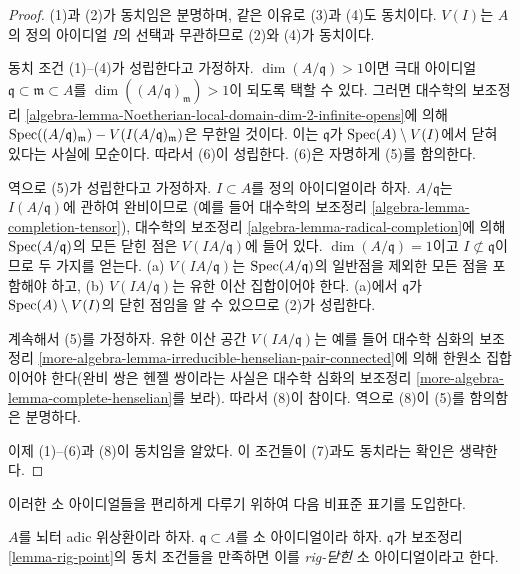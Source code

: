 \begin{proof}
(1)과 (2)가 동치임은 분명하며, 같은 이유로 (3)과 (4)도 동치이다.
$V(I)$는 $A$의 정의 아이디얼 $I$의 선택과 무관하므로 (2)와 (4)가 동치이다.

\medskip\noindent
동치 조건 (1)--(4)가 성립한다고 가정하자.
$\dim(A/\mathfrak q) > 1$이면 극대 아이디얼
$\mathfrak q \subset \mathfrak m \subset A$를
$\dim((A/\mathfrak q)_\mathfrak m) > 1$이 되도록 택할 수 있다.
그러면 대수학의 보조정리
\ref{algebra-lemma-Noetherian-local-domain-dim-2-infinite-opens}에 의해
$\mathop{\mathrm{Spec}}((A/\mathfrak q)_\mathfrak m) - V(I(A/\mathfrak q)_\mathfrak m)$은
무한일 것이다. 이는 $\mathfrak q$가 $\mathop{\mathrm{Spec}}(A) \setminus V(I)$에서
닫혀 있다는 사실에 모순이다. 따라서 (6)이 성립한다. (6)은 자명하게 (5)를 함의한다.

\medskip\noindent
역으로 (5)가 성립한다고 가정하자. $I \subset A$를 정의 아이디얼이라 하자.
$A/\mathfrak q$는 $I(A/\mathfrak q)$에 관하여 완비이므로
(예를 들어 대수학의 보조정리 \ref{algebra-lemma-completion-tensor}),
대수학의 보조정리 \ref{algebra-lemma-radical-completion}에 의해
$\mathop{\mathrm{Spec}}(A/\mathfrak q)$의 모든 닫힌 점은 $V(IA/\mathfrak q)$에 들어 있다.
$\dim(A/\mathfrak q) = 1$이고 $I \not \subset \mathfrak q$이므로 두 가지를 얻는다.
(a) $V(IA/\mathfrak q)$는 $\mathop{\mathrm{Spec}}(A/\mathfrak q)$의 일반점을 제외한
모든 점을 포함해야 하고, (b) $V(IA/\mathfrak q)$는 유한 이산 집합이어야 한다.
(a)에서 $\mathfrak q$가 $\mathop{\mathrm{Spec}}(A) \setminus V(I)$의 닫힌 점임을 알 수 있으므로
(2)가 성립한다.

\medskip\noindent
계속해서 (5)를 가정하자. 유한 이산 공간 $V(IA/\mathfrak q)$는
예를 들어 대수학 심화의 보조정리
\ref{more-algebra-lemma-irreducible-henselian-pair-connected}에 의해
한원소 집합이어야 한다(완비 쌍은 헨젤 쌍이라는 사실은 대수학 심화의 보조정리
\ref{more-algebra-lemma-complete-henselian}를 보라).
따라서 (8)이 참이다. 역으로 (8)이 (5)를 함의함은 분명하다.

\medskip\noindent
이제 (1)--(6)과 (8)이 동치임을 알았다. 이 조건들이 (7)과도 동치라는 확인은 생략한다.
\end{proof}

\noindent
이러한 소 아이디얼들을 편리하게 다루기 위하여 다음 비표준 표기를 도입한다.

\begin{definition}
\label{definition-rig-closed}
$A$를 뇌터 adic 위상환이라 하자. $\mathfrak q \subset A$를 소 아이디얼이라 하자.
$\mathfrak q$가 보조정리 \ref{lemma-rig-point}의 동치 조건들을 만족하면
이를 {\it rig-닫힌} 소 아이디얼이라고 한다.
\end{definition}


